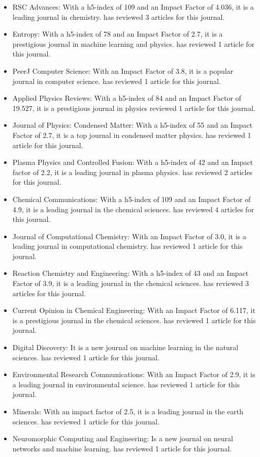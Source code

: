\documentclass[11pt]{article}
\begin{document}
\begin{itemize}
    \item RSC Advances: With a h5-index of 109 and an Impact Factor of 4.036, it is a leading journal in chemistry. \dr has reviewed 3 articles for this journal.
    \item Entropy: With a h5-index of 78 and an Impact Factor of 2.7, it is a prestigious journal in machine learning and physics. \dr has reviewed 1 article for this journal.
    \item PeerJ Computer Science: With an Impact Factor of 3.8, it is a popular journal in computer science. \dr has reviewed 1 article for this journal.
    \item Applied Physics Reviews: With a h5-index of 84 and an Impact Factor of 19.527, it is a prestigious journal in physics \dr reviewed 1 article for this journal.
    \item Journal of Physics: Condensed Matter: With a h5-index of 55 and an Impact Factor of 2.7, it is a top journal in condensed matter physics. \dr has reviewed 1 article for this journal.
    \item Plasma Physics and Controlled Fusion: With a h5-index of 42 and an Impact factor of 2.2, it is a leading journal in plasma physics. \dr has reviewed 2 articles for this journal.
    \item Chemical Communications: With a h5-index of 109 and an Impact Factor of 4.9, it is a leading journal in the chemical sciences. \dr has reviewed 4 articles for this journal.
    \item Journal of Computational Chemistry: With an Impact Factor of 3.0, it is a leading journal in computational chemistry. \dr has reviewed 1 article for this journal.
    \item Reaction Chemistry and Engineering: With a h5-index of 43 and an Impact Factor of 3.9, it is a leading journal in the chemical sciences. \dr has reviewed 3 articles for this journal.
    \item Current Opinion in Chemical Engineering: With an Impact Factor of 6.117, it is a prestigious journal in the chemical sciences. \dr has reviewed 1 article for this journal.
    \item Digital Discovery: It is a new journal on machine learning in the natural sciences. \dr has reviewed 1 article for this journal.
    \item Environmental Research Communications: With an Impact Factor of 2.9, it is a leading journal in environmental science. \dr has reviewed 1 article for this journal.
    \item Minerals: With an impact factor of 2.5, it is a leading journal in the earth sciences. \dr has reviewed 1 article for this journal.
    \item Neuromorphic Computing and Engineering: Is a new journal on neural networks and machine learning. \dr has reviewed 1 article for this journal.
\end{itemize}
\end{document}
